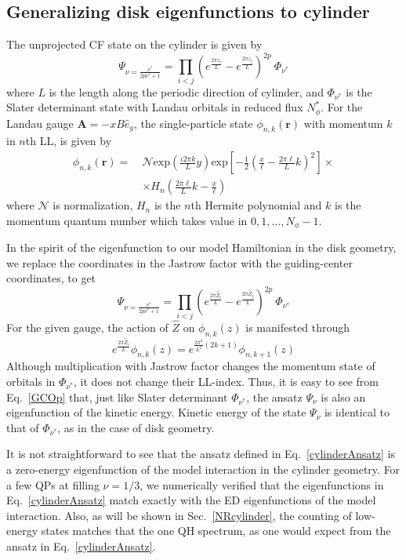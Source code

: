 \documentclass[prb,aps,epsfig,longbibliography,twocolumn]{revtex4-1}
\newcommand{\bsym}[1]{\boldsymbol{#1}}
\newcommand{\rbkt}[1]{\left( #1\right)}
\newcommand{\sbkt}[1]{\left[ #1\right]}
\newcommand{\np}{N_{\phi}}
\newcommand{\iiota}{\dot{\iota}}
\begin{document}
\subsection{Generalizing disk eigenfunctions to cylinder} 
The unprojected CF state on the cylinder is given by
\begin{equation}
\Psi_{\nu=\frac{\nu^*}{2p\nu^*+1}}=\prod_{i< j}\rbkt{e^{\frac{2\pi {z}_i}{L}}-e^{\frac{2\pi {z}_j}{L}}}^{2p}\ \Phi_{\nu^*}
\end{equation}
where $L$ is the length along the periodic direction of cylinder, and $\Phi_{\nu^*}$ is the Slater determinant state with Landau orbitals in reduced flux $\np^*$. For the Landau gauge $\bsym{A}=-xB\hat{e}_{y}$, the single-particle state $\phi_{n,k}(\bsym{r})$ with momentum $k$ in $n$th LL, is given by
\begin{align}
\phi_{n,k}(\bsym{r})=\ &\mathcal{N}\text{exp}\rbkt{ \frac{\iiota2\pi k }{L}y} \text{exp}\sbkt{-\frac{1}{2}\rbkt{\frac{x}{\ell}-\frac{2\pi \ell}{L}k}^{2}} \times \nonumber \\
& \times H_n\rbkt{\frac{2\pi \ell}{L}k-\frac{x}{\ell}}
\end{align}
where $\mathcal{N}$ is normalization, $H_n$ is the $n$th Hermite polynomial and $k$ is the momentum quantum number which takes value in $0,1,\dots,\np-1$. 

In the spirit of the eigenfunction to our model Hamiltonian in the disk geometry, we replace the coordinates in the Jastrow factor with the guiding-center coordinates, to get
\begin{equation}
\Psi_{\nu=\frac{\nu^*}{2p\nu^*+1}}=\prod_{i< j}\rbkt{e^{\frac{2\pi \hat{Z}_i}{L}}-e^{\frac{2\pi \hat{Z}_j}{L}}}^{2p}\ \Phi_{\nu^*} \label{cylinderAnsatz}
\end{equation}
For the given gauge, the action of $\hat{Z}$ on $\phi_{n,k}(z)$ is manifested through 
\begin{equation}\label{GCOp}
e^{\frac{2\pi\hat{Z}_i}{L}} \phi_{n,k}(z)=e^{\frac{2\pi^{2}}{L^2}(2k+1)} \phi_{n,k+1}(z)
\end{equation}
Although multiplication with Jastrow factor changes the momentum state of orbitals in $\Phi_{\nu^*}$, it does not change their LL-index. Thus, it is easy to see from Eq.~\eqref{GCOp} that, just like Slater determinant $\Phi_{\nu^*}$, the ansatz $\Psi_{\nu}$ is also an eigenfunction of the kinetic energy. Kinetic energy of the state  $\Psi_{\nu}$ is identical to that of  $\Phi_{\nu^*}$, as in the case of disk geometry.

It is not straightforward to see that the ansatz defined in Eq.~\eqref{cylinderAnsatz} is a zero-energy eigenfunction of the model interaction in the cylinder geometry. For a few QPs at filling $\nu=1/3$, we numerically verified that  the eigenfunctions in Eq.~\eqref{cylinderAnsatz} match exactly with the ED eigenfunctions of the model interaction. Also, as will be shown in Sec.~\ref{NRcylinder}, the counting of low-energy states matches that the one QH spectrum, as one would expect from the ansatz in Eq.~\eqref{cylinderAnsatz}.
\end{document}
